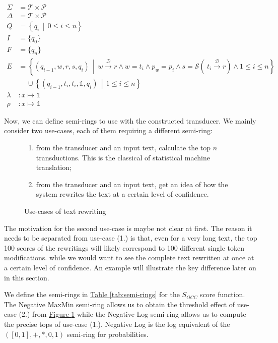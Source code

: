 \documentclass[a4paper, 11pt, onepage]{scrreprt}
\newcommand\tableref[1]{\hyperref[#1]{Table \ref*{#1}}}
\newcommand\figureref[1]{\hyperref[#1]{Figure \ref*{#1}}}
\newcommand\maps[1]{\xrightarrow{\mathcal{#1}}}
\newcommand\suchthat{\, \middle| \,}
\begin{document}
\begin{align*}
\Sigma & = \mathcal{T} \times \mathcal{P} \\
\Delta & = \mathcal{T} \times \mathcal{P} \\
Q & = \left\{ q_i \suchthat 0 \leq i \leq n \right\} \\
I & = \{ q_0 \} \\
F & = \{ q_n \} \\
E & = \left\{ (q_{i - 1}, w, r, s, q_i) \suchthat w \maps{D} r
    \land w = t_i \land p_w = p_i \land s = \mathcal{S}\left(\ t_i
      \maps{D} r \right) \land 1 \leq i \leq n \right\} \\
  & \quad \, \cup \left\{ (q_{i - 1}, t_i, t_i, \mathbb{1}, q_i)
    \suchthat 1 \leq i \leq n \right\} \\
\lambda & : x \mapsto \mathbb{1} \\
\rho & : x \mapsto \mathbb{1}
\end{align*}

Now, we can define semi-rings to use with the constructed
transducer. We mainly consider two use-cases, each of them requiring a
different semi-ring:

\begin{figure}[H]
  \centering
  \begin{enumerate}
  \item from the transducer and an input text, calculate the top $n$
    transductions. This is the classical of statistical machine
    translation;
  \item from the transducer and an input text, get an idea of how the
    system rewrites the text at a certain level of confidence.
  \end{enumerate}
  
  \caption{Use-cases of text rewriting}
\label{fig:use-cases}
\end{figure}

The motivation for the second use-case is maybe not clear at
first. The reason it needs to be separated from use-case (1.) is that,
even for a very long text, the top 100 scores of the rewritings will
likely correspond to 100 different single token modifications.  while
we would want to see the complete text rewritten at once at a certain
level of confidence. An example will illustrate the key difference
later on in this section.

We define the semi-rings in \tableref{tab:semi-rings} for the
$S_{OCC}$ score function. The Negative MaxMin semi-ring allows us to
obtain the threshold effect of use-case (2.) from
\figureref{fig:use-cases} while the Negative Log semi-ring allows us
to compute the precise tops of use-case (1.). Negative Log is the log
equivalent of the $(\left[0, 1\right], +, *, 0, 1)$ semi-ring for
probabilities.
\end{document}
